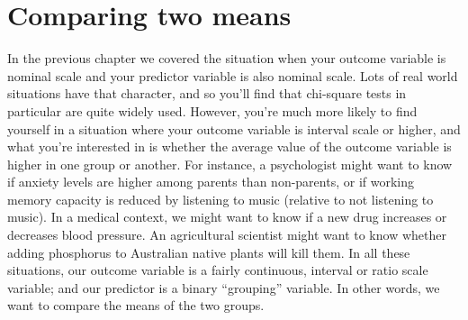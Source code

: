 

\chapter{Comparing two means \label{ch:ttest}}



\iffalse %









In the previous chapter we covered the situation when your outcome variable is nominal scale and your predictor variable is also nominal scale. Lots of real world situations have that character, and so you'll find that chi-square tests in particular are quite widely used. However, you're much more likely to find yourself in a situation where your outcome variable is interval scale or higher, and what you're interested in is whether the average value of the outcome variable is higher in one group or another. For instance, a psychologist might want to know if anxiety levels are higher among parents than non-parents, or if working memory capacity is reduced by listening to music (relative to not listening to music). In a medical context, we might want to know if a new drug increases or decreases blood pressure. An agricultural scientist might want to know whether adding phosphorus to Australian native plants will kill them. In all these situations, our outcome variable is a fairly continuous, interval or ratio scale variable; and our predictor is a binary ``grouping'' variable. In other words, we want to compare the means of the two groups. 

